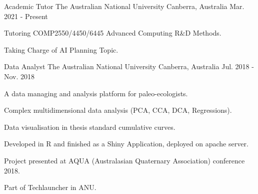 

\begin{cventries}

  \cventry
    {Academic Tutor} %
    {The Australian National University} %
    {Canberra, Australia} %
    {Mar. 2021 - Present} %
    {
      \begin{cvitems} %
        \item {Tutoring COMP2550/4450/6445 Advanced Computing R\&D Methods.}
        \item {Taking Charge of AI Planning Topic.}
      \end{cvitems}
    }


  \cventry
    {Data Analyst} %
    {The Australian National University} %
    {Canberra, Australia} %
    {Jul. 2018 - Nov. 2018} %
    {
      \begin{cvitems} %
        \item {A data managing and analysis platform for paleo-ecologists.}
        \item {Complex multidimensional data analysis (PCA, CCA, DCA, Regressions).}
        \item {Data visualisation in thesis standard cumulative curves.}
        \item {Developed in R and finished as a Shiny Application, deployed on apache server.}
        \item {Project presented at AQUA (Australasian Quaternary Association) conference 2018.}
        \item {Part of Techlauncher in ANU.}
      \end{cvitems}
    }


\end{cventries}
